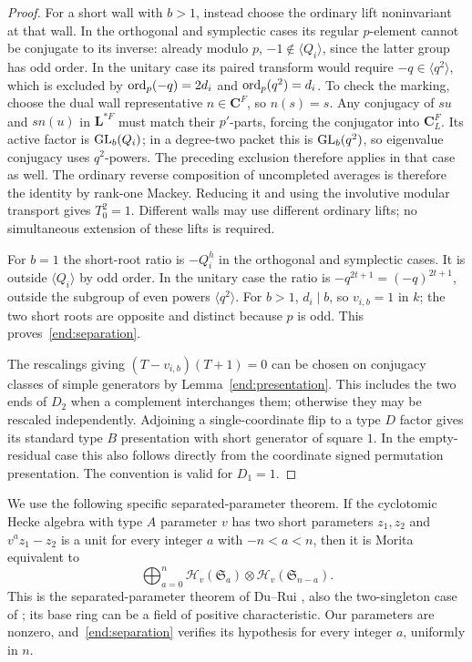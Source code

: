 \begin{proof}
For a short wall with $b>1$, instead choose the ordinary lift
noninvariant at that wall.  In the orthogonal and symplectic
cases its regular $p$-element cannot be conjugate to its inverse:
already modulo $p$, $-1\notin\langle Q_i\rangle$, since the latter
group has odd order.  In the unitary case its paired transform
would require $-q\in\langle q^2\rangle$, which is excluded by
$\operatorname{ord}_p(-q)=2d_i$ and $\operatorname{ord}_p(q^2)=d_i$.
To check the marking, choose the dual wall representative
$n\in\mathbf C^F$, so $n(s)=s$.  Any conjugacy of $su$ and
$s n(u)$ in $\mathbf L^{*F}$ must match their $p'$-parts, forcing
the conjugator into $\mathbf C_L^F$.  Its active factor is
$\operatorname{GL}_b(Q_i)$; in a degree-two packet this is $\operatorname{GL}_b(q^2)$,
so eigenvalue conjugacy uses $q^2$-powers.  The preceding
exclusion therefore applies in that case as well.
The ordinary reverse composition of uncompleted
averages is therefore the identity by rank-one Mackey.  Reducing
it and using the involutive modular transport gives $T_0^2=1$.
Different walls may use different ordinary lifts; no simultaneous
extension of these lifts is required.

For $b=1$ the short-root ratio is $-Q_i^h$ in the orthogonal and
symplectic cases.  It is outside $\langle Q_i\rangle$ by odd
order.  In the unitary case the ratio is
$-q^{2t+1}=(-q)^{2t+1}$, outside the subgroup of even powers
$\langle q^2\rangle$.  For $b>1$, $d_i\mid b$, so
$v_{i,b}=1$ in $k$; the two short roots are opposite and distinct
because $p$ is odd.  This proves~\eqref{end:separation}.

The rescalings giving $(T-v_{i,b})(T+1)=0$ can be chosen on
conjugacy classes of simple generators by
Lemma~\ref{end:presentation}.  This includes the two ends of
$D_2$ when a complement interchanges them; otherwise they may
be rescaled independently.  Adjoining a single-coordinate flip
to a type $D$ factor gives its standard type $B$ presentation
with short generator of square $1$.  In the empty-residual case
this also follows directly from the coordinate signed
permutation presentation.  The convention is valid for $D_1=1$.
\end{proof}

We use the following specific separated-parameter theorem.  If
the cyclotomic Hecke algebra with type $A$ parameter $v$ has
two short parameters $z_1,z_2$ and
$v^a z_1-z_2$ is a unit for every integer $a$ with $-n<a<n$,
then it is Morita equivalent to
\begin{equation}\label{end:dm}
 \bigoplus_{a=0}^n
  \mathcal H_v(\mathfrak S_a)\otimes
  \mathcal H_v(\mathfrak S_{n-a}).
\end{equation}
This is the separated-parameter theorem of Du--Rui
\cite[Theorem~4.14]{DuRui}, also the two-singleton case of
\cite[Theorem~1.1 and Corollary~1.4]{DipperMathas}; its base
ring can be a field of positive characteristic.  Our parameters
are nonzero, and~\eqref{end:separation} verifies its hypothesis
for every integer $a$, uniformly in $n$.

